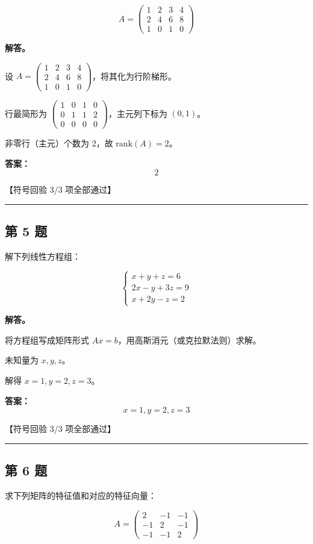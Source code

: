 \documentclass[12pt, a4paper]{article}
\newcommand{\problem}[1]{\subsection*{第 #1 题}}
\newcommand{\solution}{\textbf{解答。}}
\begin{document}
$$
A = \begin{pmatrix} 1 & 2 & 3 & 4 \\ 2 & 4 & 6 & 8 \\ 1 & 0 & 1 & 0 \end{pmatrix}
$$

\solution

设 $A = \begin{pmatrix} 1 & 2 & 3 & 4 \\ 2 & 4 & 6 & 8 \\ 1 & 0 & 1 & 0 \end{pmatrix}$，将其化为行阶梯形。

行最简形为 $\begin{pmatrix} 1 & 0 & 1 & 0 \\ 0 & 1 & 1 & 2 \\ 0 & 0 & 0 & 0 \end{pmatrix}$，主元列下标为 $(0, 1)$。

非零行（主元）个数为 $2$，故 $\mathrm{rank}(A) = 2$。

\textbf{答案：}
\[\boxed{2}\]

\textcolor{okgreen}{【符号回验 3/3 项全部通过】}

\vspace{0.8em}
\hrule
\vspace{0.8em}

\problem{5}

解下列线性方程组：

$$
\begin{cases}
x + y + z = 6 \\
2x - y + 3z = 9 \\
x + 2y - z = 2
\end{cases}
$$

\solution

将方程组写成矩阵形式 $Ax = b$，用高斯消元（或克拉默法则）求解。

未知量为 $x, y, z$。

解得 $x = 1, y = 2, z = 3$。

\textbf{答案：}
\[\boxed{x = 1, y = 2, z = 3}\]

\textcolor{okgreen}{【符号回验 3/3 项全部通过】}

\vspace{0.8em}
\hrule
\vspace{0.8em}

\problem{6}

求下列矩阵的特征值和对应的特征向量：

$$
A = \begin{pmatrix} 2 & -1 & -1 \\ -1 & 2 & -1 \\ -1 & -1 & 2 \end{pmatrix}
$$
\end{document}
